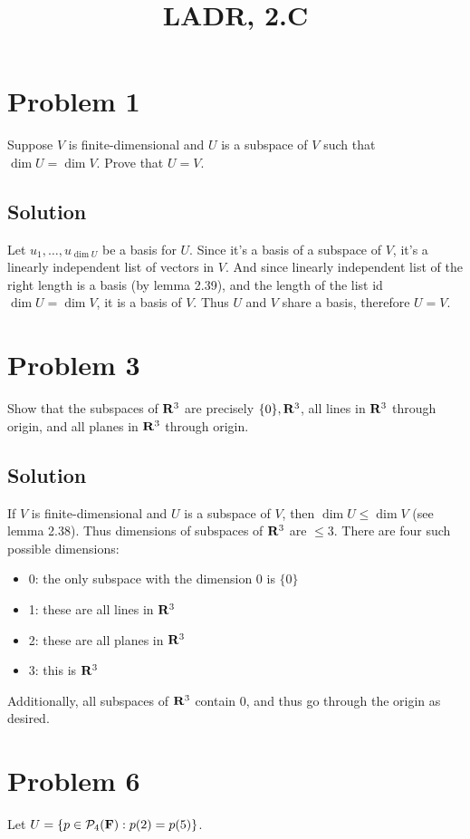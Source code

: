 \documentclass{article}
\title{LADR, 2.C}
\begin{document}
\maketitle

\section*{Problem 1}
Suppose $V$ is finite-dimensional and $U$ is a subspace of $V$ such that $\dim U=\dim V$. Prove that $U=V$.

\subsection*{Solution}
Let $u_1,\ldots,u_{\dim U}$ be a basis for $U$. Since it's a basis of a subspace of $V$, it's a linearly independent list of vectors in $V$. And since linearly independent list of the right length is a basis (by lemma 2.39), and the length of the list id $\dim U=\dim V$, it is a basis of $V$. Thus $U$ and $V$ share a basis, therefore $U=V$.

\section*{Problem 3}
Show that the subspaces of $\mathbf{R}^3$ are precisely $\{0\}, \mathbf{R}^3$, all lines in $\mathbf{R}^3$ through origin, and all planes in $\mathbf{R}^3$ through origin.

\subsection*{Solution}
If $V$ is finite-dimensional and $U$ is a subspace of $V$, then $\dim U\leq\dim V$ (see lemma 2.38). Thus dimensions of subspaces of $\mathbf{R}^3$ are $\leq 3$. There are four such possible dimensions:
\begin{itemize}
    \item 0: the only subspace with the dimension 0 is $\{0\}$
    \item 1: these are all lines in $\mathbf{R}^3$
    \item 2: these are all planes in $\mathbf{R}^3$
    \item 3: this is $\mathbf{R}^3$
\end{itemize}

Additionally, all subspaces of $\mathbf{R}^3$ contain $0$, and thus go through the origin as desired.

\newpage
\section*{Problem 6}
Let $U=\{p\in\mathcal{P}_4(\mathbf{F}):p(2)=p(5)\}$.
\end{document}
